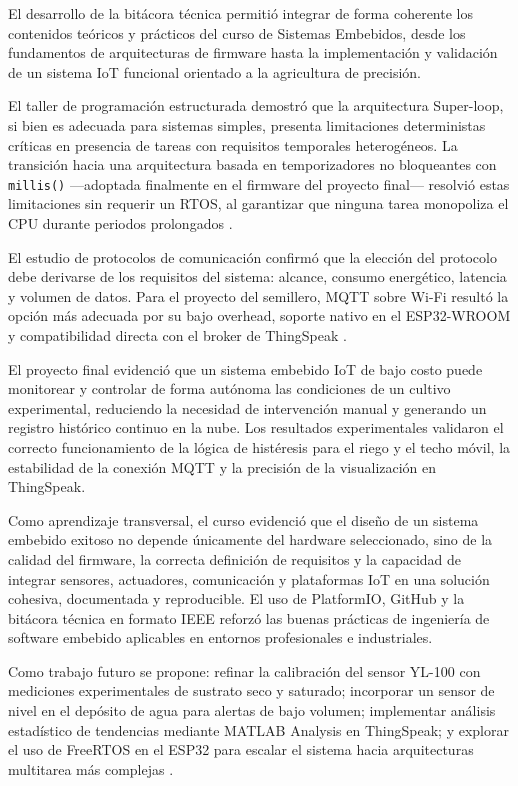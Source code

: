 \setlength{\parskip}{6pt}
\setlength{\parindent}{15pt}

El desarrollo de la bitácora técnica permitió integrar de forma coherente los contenidos teóricos y prácticos del curso de Sistemas Embebidos, desde los fundamentos de arquitecturas de firmware hasta la implementación y validación de un sistema IoT funcional orientado a la agricultura de precisión.

El taller de programación estructurada demostró que la arquitectura Super-loop, si bien es adecuada para sistemas simples, presenta limitaciones deterministas críticas en presencia de tareas con requisitos temporales heterogéneos. La transición hacia una arquitectura basada en temporizadores no bloqueantes con \texttt{millis()} —adoptada finalmente en el firmware del proyecto final— resolvió estas limitaciones sin requerir un RTOS, al garantizar que ninguna tarea monopoliza el CPU durante periodos prolongados \cite{wirth_2022_superloop}.

El estudio de protocolos de comunicación confirmó que la elección del protocolo debe derivarse de los requisitos del sistema: alcance, consumo energético, latencia y volumen de datos. Para el proyecto del semillero, MQTT sobre Wi-Fi resultó la opción más adecuada por su bajo overhead, soporte nativo en el ESP32-WROOM y compatibilidad directa con el broker de ThingSpeak \cite{sergio_2015_interrupciones}.

El proyecto final evidenció que un sistema embebido IoT de bajo costo puede monitorear y controlar de forma autónoma las condiciones de un cultivo experimental, reduciendo la necesidad de intervención manual y generando un registro histórico continuo en la nube. Los resultados experimentales validaron el correcto funcionamiento de la lógica de histéresis para el riego y el techo móvil, la estabilidad de la conexión MQTT y la precisión de la visualización en ThingSpeak.

Como aprendizaje transversal, el curso evidenció que el diseño de un sistema embebido exitoso no depende únicamente del hardware seleccionado, sino de la calidad del firmware, la correcta definición de requisitos y la capacidad de integrar sensores, actuadores, comunicación y plataformas IoT en una solución cohesiva, documentada y reproducible. El uso de PlatformIO, GitHub y la bitácora técnica en formato IEEE reforzó las buenas prácticas de ingeniería de software embebido aplicables en entornos profesionales e industriales.

Como trabajo futuro se propone: refinar la calibración del sensor YL-100 con mediciones experimentales de sustrato seco y saturado; incorporar un sensor de nivel en el depósito de agua para alertas de bajo volumen; implementar análisis estadístico de tendencias mediante MATLAB Analysis en ThingSpeak; y explorar el uso de FreeRTOS en el ESP32 para escalar el sistema hacia arquitecturas multitarea más complejas \cite{verdugamonar_2025_controladores}.
